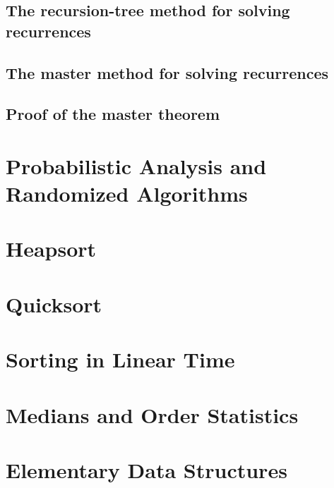 \documentclass{book}
\begin{document}
\section{The recursion-tree method for solving recurrences}

\section{The master method for solving recurrences}

\section{Proof of the master theorem}



\chapter{Probabilistic Analysis and Randomized Algorithms}





\chapter{Heapsort}




\chapter{Quicksort}




\chapter{Sorting in Linear Time}




\chapter{Medians and Order Statistics}




\chapter{Elementary Data Structures}
\end{document}
